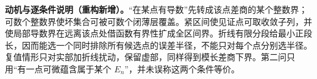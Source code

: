 \documentclass[../../main.tex]{subfiles}
\begin{document}
\begin{remark}
\textbf{动机与逐条件说明（重构新增）。}“在某点有导数”先转成该点差商的某个整数界；可数个整数界使坏集合可被可数个闭薄层覆盖。紧区间使见证点可取收敛子列，并使局部导数界在远离该点处借函数有界性扩成全区间界。折线有限分段给最小正段长，因而能选一个同时排除所有候选点的误差半径，不能只对每个点分别选半径。复值情形只对实部加折线扰动，保留虚部，同样得到模长差商下界。第二问只用“有一点可微蕴含属于某个 $E_n$”，并未误称这两个条件等价。
\end{remark}
\end{document}
